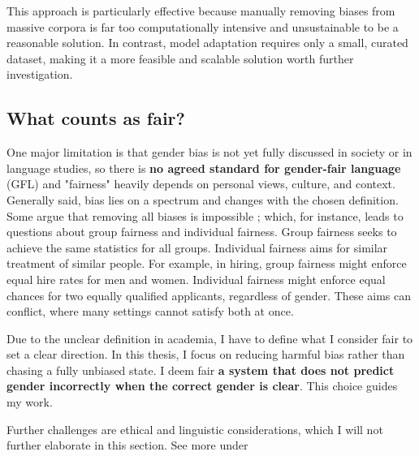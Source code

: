 This approach is particularly effective because manually removing biases from massive corpora is far too computationally intensive and unsustainable to be a reasonable solution. In contrast, model adaptation requires only a small, curated dataset, making it a more feasible and scalable solution worth further investigation.

\subsection{What counts as fair?}

One major limitation is that gender bias is not yet fully discussed in society or in language studies, so there is \textbf{no agreed standard for gender-fair language} (GFL) \citep{lardelliBuildingBridgesDataset2024, savoldiDecadeGenderBias2025} and "fairness" heavily depends on personal views, culture, and context. Generally said, bias lies on a spectrum and changes with the chosen definition. Some argue that removing all biases is impossible \citep{ullmannGenderBiasMachine2022}; which, for instance, leads to questions about group fairness and individual fairness. Group fairness seeks to achieve the same statistics for all groups. Individual fairness aims for similar treatment of similar people. For example, in hiring, group fairness might enforce equal hire rates for men and women. Individual fairness might enforce equal chances for two equally qualified applicants, regardless of gender. These aims can conflict, where many settings cannot satisfy both at once. 

Due to the unclear definition in academia, I have to define what I consider fair to set a clear direction. In this thesis, I focus on reducing harmful bias rather than chasing a fully unbiased state. I deem fair \textbf{a system that does not predict gender incorrectly when the correct gender is clear}. This choice guides my work.

Further challenges are ethical and linguistic considerations, which I will not further elaborate in this section. See more under %
